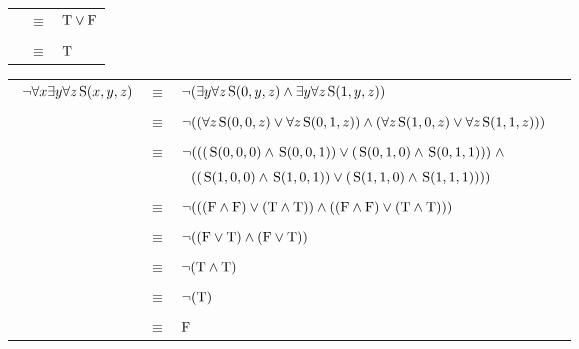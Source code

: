 \documentclass{article}
\newcommand{\True}{\textnormal{T}}
\newcommand{\False}{\textnormal{F}}
\newcommand{\predS}{\hspace{0.05cm} \textnormal{S}}
\newcommand{\predicate}{\predS (x,y,z)}
\begin{document}
\begin{enumerate}
{\begin{center}
\begin{tabular}{ccl}
    & $\equiv$ & $\True \lor \False$ \\ \\
    
    & $\equiv$ & $\True$ \\ 
    \end{tabular}\end{center}
    }
    {
    \begin{center}\begin{tabular}{ccl}\
    $\lnot \forall x \exists y \forall z \predicate$ & $\equiv$ & $\lnot (\exists y \forall z \predS(0,y,z) \land \exists y \forall z \predS(1,y,z))$ \\ \\
    
    & $\equiv$ & $\lnot ((\forall z \predS(0,0,z) \lor \forall z \predS(0,1,z)) \land (\forall z \predS(1,0,z) \lor \forall z \predS(1,1,z))) \hspace{0.42cm}$ \\ \\
    
    & $\equiv$ & $\lnot (((\predS(0,0,0) \land \predS(0,0,1)) \lor (\predS(0,1,0) \land \predS(0,1,1))) \hspace{0.1cm} \land$ \\
    & & $\hspace{0.235cm} ((\predS(1,0,0) \land \predS(1,0,1)) \lor (\predS(1,1,0) \land \predS(1,1,1)))) \hspace{0.42cm}$ \\ \\
    
    & $\equiv$ & $\lnot (((\False \land \False) \lor (\True \land \True)) \land ((\False \land \False) \lor (\True \land \True)))$ \\ \\
    
    & $\equiv$ & $\lnot ((\False \lor \True) \land (\False \lor \True))$ \\ \\
    
    & $\equiv$ & $\lnot (\True \land \True)$ \\ \\
    
    & $\equiv$ & $\lnot (\True)$ \\ \\

    & $\equiv$ & $\False$ \\ 
    \end{tabular}\end{center}

}
\end{enumerate}
\end{document}
